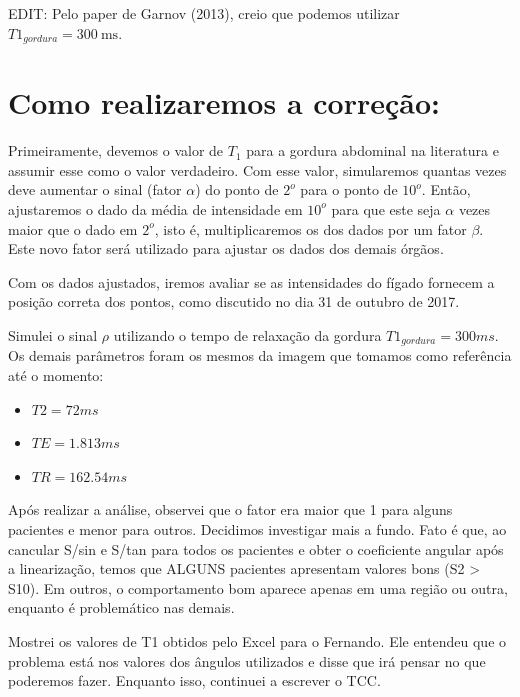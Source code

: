 \documentclass[idxtotoc,hyperref,openany]{labbook} %
\begin{document}
EDIT: Pelo paper de Garnov (2013), creio que podemos utilizar $T1_{gordura}=\SI{300}{\milli \second}$.

 \section*{Como realizaremos a correção:}
 
  Primeiramente, devemos o valor de $T_1$ para a gordura abdominal na literatura e assumir esse como o valor verdadeiro. Com esse valor, simularemos quantas vezes deve aumentar o sinal (fator $\alpha$) do ponto de $2^o$ para o ponto de $10^o$. Então, ajustaremos o dado da média de intensidade em $10^o$ para que este seja $\alpha$ vezes maior que o dado em $2^o$, isto é, multiplicaremos os dos dados por um fator $\beta$. Este novo fator será utilizado para ajustar os dados dos demais órgãos.
  
  Com os dados ajustados, iremos avaliar se as intensidades do fígado fornecem a posição correta dos pontos, como discutido no dia 31 de outubro de 2017. 




Simulei o sinal $\rho$ utilizando o tempo de relaxação da gordura $T1_{gordura} = 300 ms$. Os demais parâmetros foram os mesmos da imagem que tomamos como referência até o momento:

\begin{itemize}
	\item $T2 = 72 ms$
	\item $TE = 1.813 ms$
	\item $TR = 162.54 ms$
\end{itemize}

Após realizar a análise, observei que o fator era maior que 1 para alguns pacientes e menor para outros. Decidimos investigar mais a fundo. Fato é que, ao cancular S/sin e S/tan para todos os pacientes e obter o coeficiente angular após a linearização, temos que ALGUNS pacientes apresentam valores bons (S2 > S10). Em outros, o comportamento bom aparece apenas em uma região ou outra, enquanto é problemático nas demais.



Mostrei os valores de T1 obtidos pelo Excel para o Fernando. Ele entendeu que o problema está nos valores dos ângulos utilizados e disse que irá pensar no que poderemos fazer. Enquanto isso, continuei a escrever o TCC.
\end{document}

